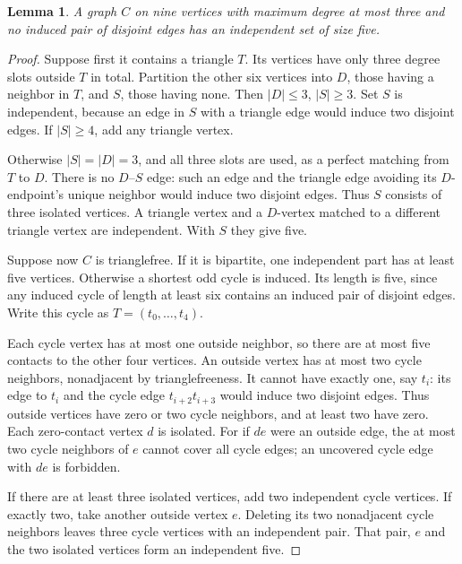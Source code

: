 \documentclass[11pt]{article}
\newtheorem{lemma}[theorem]{Lemma}
\theoremstyle{remark}
\begin{document}
\begin{lemma}\label{lem:nine}
A graph $C$ on nine vertices with maximum degree at most three and
no induced pair of disjoint edges has an independent set of size five.
\end{lemma}
\begin{proof}
Suppose first it contains a triangle $T$. Its vertices have only three
degree slots outside $T$ in total. Partition the other six vertices
into $D$, those having a neighbor in $T$, and $S$, those having none.
Then $|D|\le3$, $|S|\ge3$. Set $S$ is independent, because an edge
in $S$ with a triangle edge would induce two disjoint edges. If
$|S|\ge4$, add any triangle vertex.

Otherwise $|S|=|D|=3$, and all three slots are used, as a perfect
matching from $T$ to $D$. There is no $D$--$S$ edge: such an edge
and the triangle edge avoiding its $D$-endpoint's unique neighbor
would induce two disjoint edges. Thus $S$ consists of three isolated
vertices. A triangle vertex and a $D$-vertex matched to a different
triangle vertex are independent. With $S$ they give five.

Suppose now $C$ is trianglefree. If it is bipartite, one independent
part has at least five vertices. Otherwise a shortest odd cycle is
induced. Its length is five, since any induced cycle of length at
least six contains an induced pair of disjoint edges. Write this
cycle as $T=(t_0,\ldots,t_4)$.

Each cycle vertex has at most one outside neighbor, so there are at
most five contacts to the other four vertices. An outside vertex has
at most two cycle neighbors, nonadjacent by trianglefreeness. It
cannot have exactly one, say $t_i$: its edge to $t_i$ and the cycle
edge $t_{i+2}t_{i+3}$ would induce two disjoint edges. Thus outside
vertices have zero or two cycle neighbors, and at least two have zero.
Each zero-contact vertex $d$ is isolated. For if $de$ were an outside
edge, the at most two cycle neighbors of $e$ cannot cover all cycle
edges; an uncovered cycle edge with $de$ is forbidden.

If there are at least three isolated vertices, add two independent
cycle vertices. If exactly two, take another outside vertex $e$.
Deleting its two nonadjacent cycle neighbors leaves three cycle
vertices with an independent pair. That pair, $e$ and the two
isolated vertices form an independent five.
\end{proof}
\end{document}

